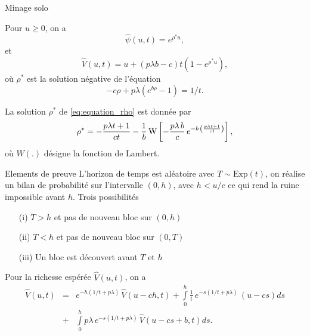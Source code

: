 \documentclass{beamer}
\begin{document}
\begin{frame}{Minage solo}
\scriptsize
\begin{tcolorbox}[enhanced,drop shadow, title=Theorem (profit and ruin when mining solo)]
Pour $u\geq0$, on a 
\begin{equation*}
\widehat{\psi}(u,t) = e^{\rho^\ast u},
\end{equation*}
et 
\begin{equation*}
\widehat{V}(u,t) = u+(p\lambda b-c)t\left(1-e^{\rho^\ast u }\right),
\end{equation*}
où $\rho^\ast$ est la solution négative de l'équation
\begin{equation}\label{eq:equation_rho}
-c\rho + p\lambda(e^{b\rho}-1) = 1/t.
\end{equation}
\end{tcolorbox}
\begin{tcolorbox}[enhanced,drop shadow, title=Lambert function]
La solution $\rho^\ast$ de \eqref{eq:equation_rho} est donnée par 
\begin{equation*}
  \rho^{\ast}=-\frac{p \lambda t+1}{ct}
  -\frac{1}{b} \,{\rm W} \left[-\frac{p\lambda
    \,b}{c}\,{e^{-b\,\left(\frac{p \lambda t+1}{ct}\right)}}
  \right],
  \end{equation*}
  où $W(.)$ désigne la fonction de Lambert.
\end{tcolorbox}
\end{frame}
\begin{frame}{Elements de preuve}
\scriptsize
L'horizon de temps est aléatoire avec $T\sim\text{Exp}(t)$, on réalise un bilan de probabilité sur l'intervalle $(0,h)$, avec $h<u/c$ ce qui rend la ruine impossible avant $h$. Trois possibilités
\begin{itemize}
  \item[(i)] $T>h$ et pas de nouveau bloc sur $(0,h)$
  \item[(ii)] $T<h$ et pas de nouveau bloc sur $(0,T)$
  \item[(iii)] Un bloc est découvert avant $T$ et $h$
\end{itemize}
Pour la richesse espérée $\widehat{V}(u,t)$, on a 
\begin{eqnarray*}
  \widehat{V}(u,t)& =&e^{-h(1/t + p\lambda)}\,\widehat{V}(u-ch,t)+\int\limits_0^h\frac1t\, e^{-s(1/t + p\lambda)}\,(u-cs)ds\\
  &+&\int\limits_0^h p\lambda\, e^{-s(1/t + p\lambda)}\,\widehat{V}(u-cs+b,t)ds.
  \end{eqnarray*}
  \end{frame}
\end{document}
